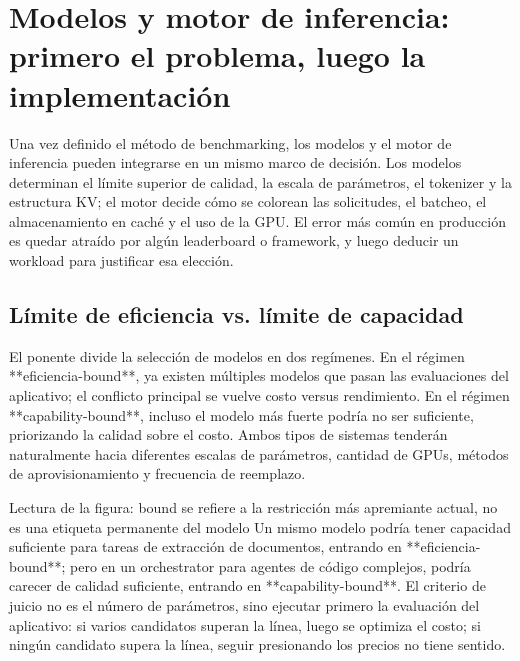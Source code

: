 \section{Modelos y motor de inferencia: primero el problema, luego la implementación}

Una vez definido el método de benchmarking, los modelos y el motor de inferencia pueden integrarse en un mismo marco de decisión. Los modelos determinan el límite superior de calidad, la escala de parámetros, el tokenizer y la estructura KV; el motor decide cómo se colorean las solicitudes, el batcheo, el almacenamiento en caché y el uso de la GPU. El error más común en producción es quedar atraído por algún leaderboard o framework, y luego deducir un workload para justificar esa elección.

\subsection{Límite de eficiencia vs. límite de capacidad}

El ponente divide la selección de modelos en dos regímenes. En el régimen **eficiencia-bound**, ya existen múltiples modelos que pasan las evaluaciones del aplicativo; el conflicto principal se vuelve costo versus rendimiento. En el régimen **capability-bound**, incluso el modelo más fuerte podría no ser suficiente, priorizando la calidad sobre el costo. Ambos tipos de sistemas tenderán naturalmente hacia diferentes escalas de parámetros, cantidad de GPUs, métodos de aprovisionamiento y frecuencia de reemplazo.


\begin{knowledgebox}{Lectura de la figura: bound se refiere a la restricción más apremiante actual, no es una etiqueta permanente del modelo}
Un mismo modelo podría tener capacidad suficiente para tareas de extracción de documentos, entrando en **eficiencia-bound**; pero en un orchestrator para agentes de código complejos, podría carecer de calidad suficiente, entrando en **capability-bound**. El criterio de juicio no es el número de parámetros, sino ejecutar primero la evaluación del aplicativo: si varios candidatos superan la línea, luego se optimiza el costo; si ningún candidato supera la línea, seguir presionando los precios no tiene sentido.
\end{knowledgebox}

